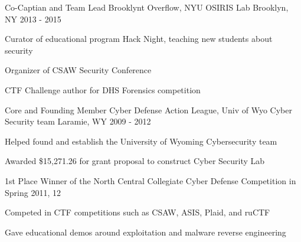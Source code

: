 


\begin{cventries}


\cventry
{Co-Captian and Team Lead} %
{Brooklynt Overflow, NYU OSIRIS Lab} %
{Brooklyn, NY} %
{2013 - 2015} %
{ %
\begin{cvitems}
\item {Curator of educational program Hack Night, teaching new students about security}
\item {Organizer of CSAW Security Conference}
\item {CTF Challenge author for DHS Forensics competition}
\end{cvitems}
}


\cventry
{Core and Founding Member} %
{Cyber Defense Action League, Univ of Wyo Cyber Security team} %
{Laramie, WY} %
{2009 - 2012} %
{ %
\begin{cvitems}
\item {Helped found and establish the University of Wyoming Cybersecurity team}
\item {Awarded \$15,271.26 for grant proposal to construct Cyber Security Lab}
\item {1st Place Winner of the North Central Collegiate Cyber Defense Competition in Spring 2011, 12}
\item {Competed in CTF competitions such as CSAW, ASIS, Plaid, and ruCTF}
\item {Gave educational demos around exploitation and malware reverse engineering}
\end{cvitems}
}



\end{cventries}
